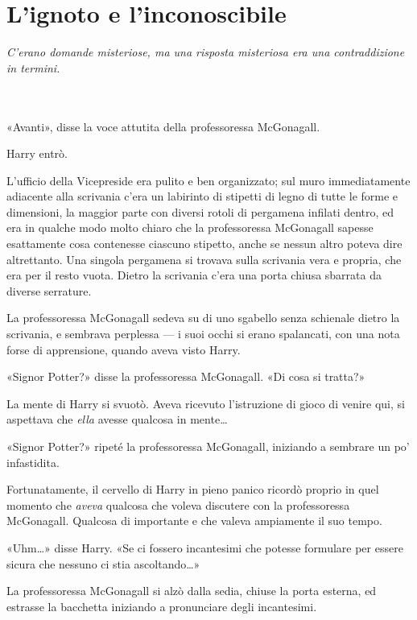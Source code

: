 
\chapter{L’ignoto e l’inconoscibile}
\label{capitolo:14}

\emph{C’erano domande misteriose, ma una risposta misteriosa era una contraddizione in termini.}

~\\
~\\

«Avanti», disse la voce attutita della professoressa McGonagall.

Harry entrò.

L’ufficio della Vicepreside era pulito e ben organizzato; sul muro immediatamente adiacente alla scrivania c’era un labirinto di stipetti di legno di tutte le forme e dimensioni, la maggior parte con diversi rotoli di pergamena infilati dentro, ed era in qualche modo molto chiaro che la professoressa McGonagall sapesse esattamente cosa contenesse ciascuno stipetto, anche se nessun altro poteva dire altrettanto. Una singola pergamena si trovava sulla scrivania vera e propria, che era per il resto vuota. Dietro la scrivania c’era una porta chiusa sbarrata da diverse serrature.

La professoressa McGonagall sedeva su di uno sgabello senza schienale dietro la scrivania, e sembrava perplessa — i suoi occhi si erano spalancati, con una nota forse di apprensione, quando aveva visto Harry.

«Signor Potter?» disse la professoressa McGonagall. «Di cosa si tratta?»

La mente di Harry si svuotò. Aveva ricevuto l’istruzione di gioco di venire qui, si aspettava che \textit{ella} avesse qualcosa in mente…

«Signor Potter?» ripeté la professoressa McGonagall, iniziando a sembrare un po’ infastidita.

Fortunatamente, il cervello di Harry in pieno panico ricordò proprio in quel momento che \textit{aveva} qualcosa che voleva discutere con la professoressa McGonagall. Qualcosa di importante e che valeva ampiamente il suo tempo.

«Uhm…» disse Harry. «Se ci fossero incantesimi che potesse formulare per essere sicura che nessuno ci stia ascoltando…»

La professoressa McGonagall si alzò dalla sedia, chiuse la porta esterna, ed estrasse la bacchetta iniziando a pronunciare degli incantesimi.

